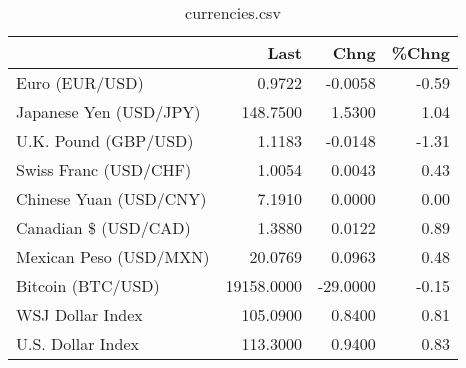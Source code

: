 \documentclass{article}%
\begin{document}
%


\begin{table}[htbp]%
\caption{currencies.csv}%
\centering%
\begin{adjustbox}{width=1\textwidth}%
\begin{tabular}{lrrr}
\toprule
                       &       Last &     Chng &  \%Chng \\
\midrule
        Euro (EUR/USD) &     0.9722 &  -0.0058 &  -0.59 \\
Japanese Yen (USD/JPY) &   148.7500 &   1.5300 &   1.04 \\
  U.K. Pound (GBP/USD) &     1.1183 &  -0.0148 &  -1.31 \\
 Swiss Franc (USD/CHF) &     1.0054 &   0.0043 &   0.43 \\
Chinese Yuan (USD/CNY) &     7.1910 &   0.0000 &   0.00 \\
  Canadian \$ (USD/CAD) &     1.3880 &   0.0122 &   0.89 \\
Mexican Peso (USD/MXN) &    20.0769 &   0.0963 &   0.48 \\
     Bitcoin (BTC/USD) & 19158.0000 & -29.0000 &  -0.15 \\
      WSJ Dollar Index &   105.0900 &   0.8400 &   0.81 \\
     U.S. Dollar Index &   113.3000 &   0.9400 &   0.83 \\
\bottomrule
\end{tabular}
%
\end{adjustbox}%
\end{table}

%
\end{document}

